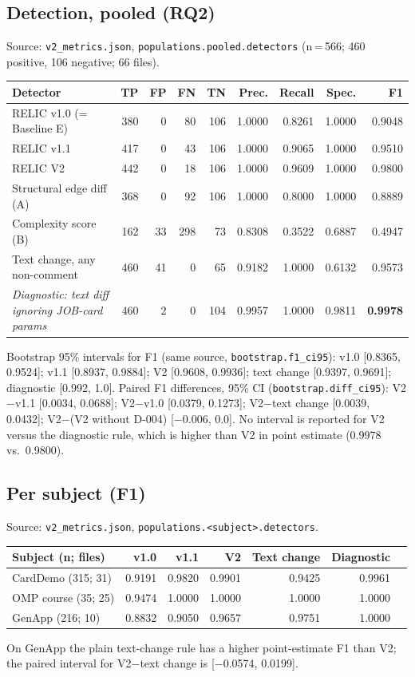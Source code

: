 \subsection{Detection, pooled (RQ2)}
Source: \texttt{v2\_metrics.json}, \texttt{populations.pooled.detectors}
(n\,=\,566; 460 positive, 106 negative; 66 files).
\begin{center}
\small
\begin{tabular}{@{}lrrrrrrrr@{}}
\toprule
Detector & TP & FP & FN & TN & Prec. & Recall & Spec. & F1 \\
\midrule
RELIC v1.0 (= Baseline E) & 380 & 0 & 80 & 106 & 1.0000 & 0.8261 & 1.0000 & 0.9048 \\
RELIC v1.1 & 417 & 0 & 43 & 106 & 1.0000 & 0.9065 & 1.0000 & 0.9510 \\
RELIC V2 & 442 & 0 & 18 & 106 & 1.0000 & 0.9609 & 1.0000 & 0.9800 \\
Structural edge diff (A) & 368 & 0 & 92 & 106 & 1.0000 & 0.8000 & 1.0000 & 0.8889 \\
Complexity score (B) & 162 & 33 & 298 & 73 & 0.8308 & 0.3522 & 0.6887 & 0.4947 \\
Text change, any non-comment & 460 & 41 & 0 & 65 & 0.9182 & 1.0000 & 0.6132 & 0.9573 \\
\emph{Diagnostic: text diff ignoring JOB-card params} & 460 & 2 & 0 & 104 & 0.9957 & 1.0000 & 0.9811 & \textbf{0.9978} \\
\bottomrule
\end{tabular}
\end{center}
Bootstrap 95\% intervals for F1 (same source, \texttt{bootstrap.f1\_ci95}):
v1.0 [0.8365, 0.9524]; v1.1 [0.8937, 0.9884]; V2 [0.9608, 0.9936];
text change [0.9397, 0.9691]; diagnostic [0.992, 1.0].
Paired F1 differences, 95\% CI (\texttt{bootstrap.diff\_ci95}):
V2$-$v1.1 [0.0034, 0.0688]; V2$-$v1.0 [0.0379, 0.1273];
V2$-$text change [0.0039, 0.0432]; V2$-$(V2 without D-004) [$-$0.006, 0.0].
No interval is reported for V2 versus the diagnostic rule, which is higher than V2
in point estimate (0.9978 vs.\ 0.9800).

\subsection{Per subject (F1)}
Source: \texttt{v2\_metrics.json}, \texttt{populations.<subject>.detectors}.
\begin{center}
\small
\begin{tabular}{@{}lrrrrrr@{}}
\toprule
Subject (n; files) & v1.0 & v1.1 & V2 & Text change & Diagnostic \\
\midrule
CardDemo (315; 31) & 0.9191 & 0.9820 & 0.9901 & 0.9425 & 0.9961 \\
OMP course (35; 25) & 0.9474 & 1.0000 & 1.0000 & 1.0000 & 1.0000 \\
GenApp (216; 10) & 0.8832 & 0.9050 & 0.9657 & 0.9751 & 1.0000 \\
\bottomrule
\end{tabular}
\end{center}
On GenApp the plain text-change rule has a higher point-estimate F1 than V2; the
paired interval for V2$-$text change is [$-$0.0574, 0.0199].

